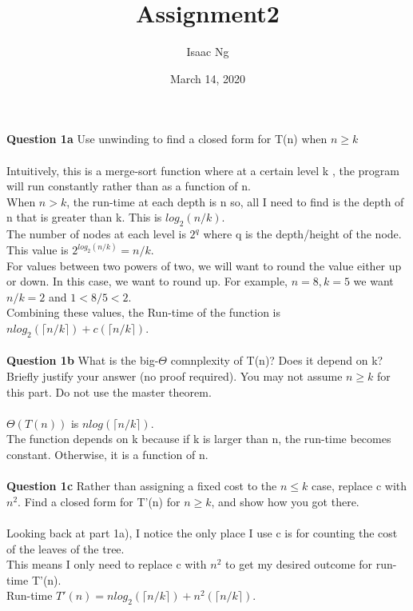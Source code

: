 \documentclass[12pt]{article}
\title{Assignment2}
\author{Isaac Ng}
\date{March 14, 2020}
\begin{document}
\maketitle

\noindent\textbf{Question 1a} Use unwinding to find a closed form for T(n) when $n \geq k$
\\
\\
Intuitively, this is a merge-sort function where at a certain level k , the program will run constantly rather than as a function of n.\\
When $n > k$, the run-time at each depth is n so, all I need to find is the depth of n that is greater than k. This is $log_2(n/k)$.\\
The number of nodes at each level is $2^{q}$ where q is the depth/height of the node. This value is $2^{log_2(n/k)}=n/k$.\\
For values between two powers of two, we will want to round the value either up or down. In this case, we want to round up. For example, $n=8, k=5$ we want $n/k=2$ and $1<8/5<2$.\\
Combining these values, the Run-time of the function is $nlog_2(\lceil n/k \rceil) + c(\lceil n/k \rceil)$.\\
\\
\noindent\textbf{Question 1b} What is the big-$\Theta$ comnplexity of T(n)? Does it depend on k? Briefly justify your answer (no proof required). You may not assume $n\geq k$ for this part. Do not use the master theorem.
\\
\\
$\Theta(T(n))$ is $nlog(\lceil n/k \rceil)$.\\
The function depends on k because if k is larger than n, the run-time becomes constant. Otherwise, it is a function of n.\\
\\
\noindent\textbf{Question 1c} Rather than assigning a fixed cost to the $n\leq k$ case, replace c with $n^2$. Find a closed form for T'(n) for $n\geq k$, and show how you got there.
\\
\\
Looking back at part 1a), I notice the only place I use c is for counting the cost of the leaves of the tree.\\
This means I only need to replace c with $n^2$ to get my desired outcome for run-time T'(n).\\
Run-time $T'(n) = nlog_2(\lceil n/k \rceil) + n^2(\lceil n/k \rceil)$.\\
\\
\end{document}
